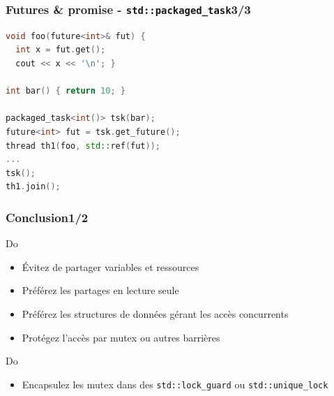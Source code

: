 \documentclass[C++.tex]{subfiles}
\begin{document}
\begin{frame}[fragile]
	\frametitle{Futures \& promise - \lstinline|std::packaged_task|\titlehfill{}3/3}
	\begin{lstlisting}[language=C++]
void foo(future<int>& fut) {
  int x = fut.get();
  cout << x << '\n'; }

int bar() { return 10; }

packaged_task<int()> tsk(bar);
future<int> fut = tsk.get_future();
thread th1(foo, std::ref(fut));
...
tsk();
th1.join();\end{lstlisting}
\end{frame}

\begin{frame}[fragile]
	\frametitle{Conclusion\titlehfill{}1/2}
	\begin{exampleblock}{Do}
		\begin{itemize}
			\item Évitez de partager variables et ressources
			\item Préférez les partages en lecture seule
			\item Préférez les structures de données gérant les accès concurrents


			\item Protégez l'accès par mutex ou autres barrières


		\end{itemize}


	\end{exampleblock}

	\begin{exampleblock}{Do}
		\begin{itemize}
			\item Encapsulez les mutex dans des \lstinline|std::lock_guard| ou \lstinline|std::unique_lock|
		\end{itemize}
	\end{exampleblock}
\end{frame}
\end{document}
